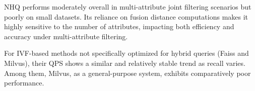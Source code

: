 \documentclass[sigconf, nonacm]{acmart}
\begin{document}
{	NHQ performs moderately overall in multi-attribute joint filtering scenarios but poorly on small datasets. Its reliance on fusion distance computations makes it highly sensitive to the number of attributes, impacting both efficiency and accuracy under multi-attribute filtering.
	
	For IVF-based methods not specifically optimized for hybrid queries (Faiss and Milvus), their QPS shows a similar and relatively stable trend as recall varies. Among them, Milvus, as a general-purpose system, exhibits comparatively poor performance.
	
%	
%	
%
%	
	
}
\end{document}

